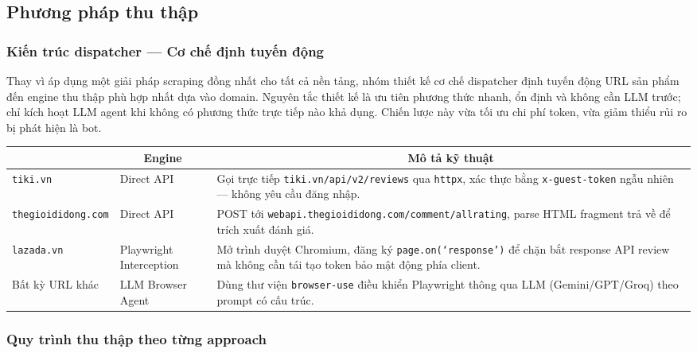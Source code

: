 \subsection{Phương pháp thu thập}

\subsubsection{Kiến trúc dispatcher --- Cơ chế định tuyến động}

Thay vì áp dụng một giải pháp scraping đồng nhất cho tất cả nền tảng, nhóm thiết kế cơ chế dispatcher định tuyến động URL sản phẩm đến engine thu thập phù hợp nhất dựa vào domain. Nguyên tắc thiết kế là ưu tiên phương thức nhanh, ổn định và không cần LLM trước; chỉ kích hoạt LLM agent khi không có phương thức trực tiếp nào khả dụng. Chiến lược này vừa tối ưu chi phí token, vừa giảm thiểu rủi ro bị phát hiện là bot.

\begin{center}
\renewcommand{\arraystretch}{1.4}
\begin{tabularx}{\textwidth}{|l|l|X|}
\hline
\rowcolor[HTML]{E8E8E8}
\multicolumn{1}{|c|}{\textbf{Domain nhận dạng}} &
\multicolumn{1}{c|}{\textbf{Engine}} &
\multicolumn{1}{c|}{\textbf{Mô tả kỹ thuật}} \\
\hline
\texttt{tiki.vn} & Direct API & Gọi trực tiếp \texttt{tiki.vn/api/v2/reviews} qua \texttt{httpx}, xác thực bằng \texttt{x-guest-token} ngẫu nhiên --- không yêu cầu đăng nhập. \\
\hline
\texttt{thegioididong.com} & Direct API & 
POST tới \texttt{webapi.thegioididong.com/\allowbreak comment/\allowbreak allrating}, parse HTML fragment trả về để trích xuất đánh giá. \\
\hline
\texttt{lazada.vn} & Playwright Interception & Mở trình duyệt Chromium, đăng ký \texttt{page.on(`response')} để chặn bắt response API review mà không cần tái tạo token bảo mật động phía client. \\
\hline
Bất kỳ URL khác & LLM Browser Agent & Dùng thư viện \texttt{browser-use} điều khiển Playwright thông qua LLM (Gemini/GPT/Groq) theo prompt có cấu trúc. \\
\hline
\end{tabularx}
\end{center}

\subsubsection{Quy trình thu thập theo từng approach}

